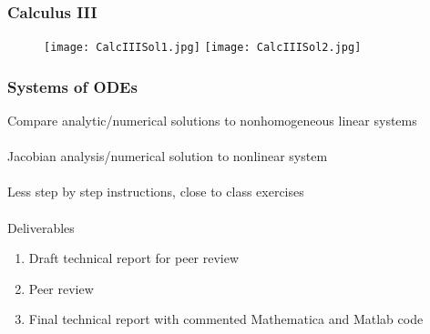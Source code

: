 \documentclass{beamer}
\begin{document}

\begin{frame}
\begin{center}
\frametitle{Calculus III}

\begin{figure}

\texttt{[image: CalcIIISol1.jpg]}
\hspace{7.5 mm}
\texttt{[image: CalcIIISol2.jpg]}

\end{figure}

\end{center}
\end{frame}


\begin{frame}
\begin{center}
\frametitle{Systems of ODEs}

Compare analytic/numerical solutions to nonhomogeneous linear systems\\

~\\

Jacobian analysis/numerical solution to nonlinear system\\

~\\

Less step by step instructions, close to class exercises\\

~\\

Deliverables

\begin{enumerate}

\item Draft technical report for peer review

\item Peer review

\item Final technical report with commented Mathematica and Matlab code

\end{enumerate}

\end{center}
\end{frame}

\end{document}
